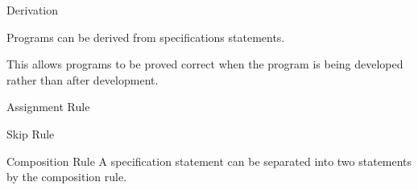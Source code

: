 \begin{topic}{Derivation}

Programs can be derived from specifications statements.

This allows programs to be proved correct when the program is being developed rather than after development.

\end{topic}

\begin{topic}{Assignment Rule}

\end{topic}

\begin{topic}{Skip Rule}

\end{topic}

\begin{topic}{Composition Rule}
A specification statement can be separated into two statements by the composition rule.

\end{topic}

